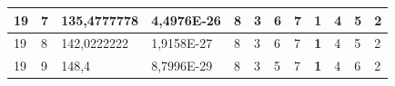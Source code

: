 \documentclass[conference]{IEEEtran}
\begin{document}
\begin{table}[]
\begin{tabular}{|llll|llllllll|}
\multicolumn{1}{|l|}{19}                                                             & \multicolumn{1}{l|}{7}                                                                 & \multicolumn{1}{l|}{135,4777778}                                                           & 4,4976E-26                              & \multicolumn{1}{l|}{8}                                                           & \multicolumn{1}{l|}{3}                                                           & \multicolumn{1}{l|}{6}                                                           & \multicolumn{1}{l|}{7}                                                           & \multicolumn{1}{l|}{\textbf{1}}                                                  & \multicolumn{1}{l|}{4}                                                           & \multicolumn{1}{l|}{5}                                                           & 2                                   \\ \hline
\multicolumn{1}{|l|}{19}                                                             & \multicolumn{1}{l|}{8}                                                                 & \multicolumn{1}{l|}{142,0222222}                                                           & 1,9158E-27                              & \multicolumn{1}{l|}{8}                                                           & \multicolumn{1}{l|}{3}                                                           & \multicolumn{1}{l|}{6}                                                           & \multicolumn{1}{l|}{7}                                                           & \multicolumn{1}{l|}{\textbf{1}}                                                  & \multicolumn{1}{l|}{4}                                                           & \multicolumn{1}{l|}{5}                                                           & 2                                   \\ \hline
\multicolumn{1}{|l|}{19}                                                             & \multicolumn{1}{l|}{9}                                                                 & \multicolumn{1}{l|}{148,4}                                                                 & 8,7996E-29                              & \multicolumn{1}{l|}{8}                                                           & \multicolumn{1}{l|}{3}                                                           & \multicolumn{1}{l|}{5}                                                           & \multicolumn{1}{l|}{7}                                                           & \multicolumn{1}{l|}{\textbf{1}}                                                  & \multicolumn{1}{l|}{4}                                                           & \multicolumn{1}{l|}{6}                                                           & 2                                   \\ \hline

\end{tabular}
\end{table}
\end{document}
